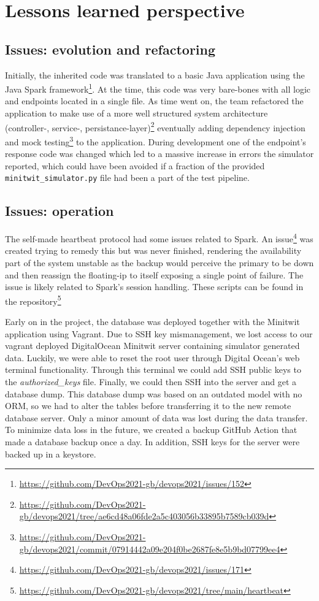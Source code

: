 \section{Lessons learned perspective} \label{section:Lessons learned perspective}
\subsection{Issues: evolution and refactoring}
Initially, the inherited code was translated to a basic Java application using the Java Spark framework\footnote{\url{https://github.com/DevOps2021-gb/devops2021/issues/152}}. At the time, this code was very bare-bones with all logic and endpoints located in a single file. As time went on, the team refactored the application to make use of a more well structured system architecture (controller-, service-, persistance-layer)\footnote{\url{https://github.com/DevOps2021-gb/devops2021/tree/ae6cd48a06fde2a5c403056b33895b7589cb039d}} eventually adding dependency injection and mock testing\footnote{\url{https://github.com/DevOps2021-gb/devops2021/commit/07914442a09e204f0be2687fe8e5b9bd07799ee4}} to the application. 
During development one of the endpoint's response code was changed which led to a massive increase in errors the simulator reported, which could have been avoided if a fraction of the provided \texttt{minitwit\_simulator.py} file had been a part of the test pipeline.

\subsection{Issues: operation}
\label{issues-operation}
The self-made heartbeat protocol had some issues related to Spark. An issue\footnote{\url{https://github.com/DevOps2021-gb/devops2021/issues/171}} was created trying to remedy this but was never finished, rendering the availability part of the system unstable as the backup would perceive the primary to be down and then reassign the floating-ip to itself exposing a single point of failure. The issue is likely related to Spark's session handling. These scripts can be found in the repository\footnote{\url{https://github.com/DevOps2021-gb/devops2021/tree/main/heartbeat}}

Early on in the project, the database was deployed together with the Minitwit application using Vagrant. Due to SSH key mismanagement, we lost access to our vagrant deployed DigitalOcean Minitwit server containing simulator generated data. Luckily, we were able to reset the root user through Digital Ocean's web terminal functionality. Through this terminal we could add SSH public keys to the \textit{authorized\_keys} file. Finally, we could then SSH into the server and get a database dump. This database dump was based on an outdated model with no ORM, so we had to alter the tables before transferring it to the new remote database server. Only a minor amount of data was lost during the data transfer. To minimize data loss in the future, we created a backup GitHub Action that made a database backup once a day. In addition, SSH keys for the server were backed up in a keystore.

